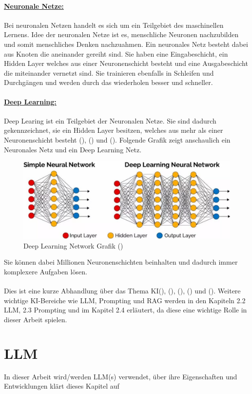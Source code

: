 \documentclass[12pt,toc=bib,toc=listof]{scrreprt}
\begin{document}
\\
\textbf{\underline{Neuronale Netze:}}\\
\\
Bei neuronalen Netzen handelt es sich um ein Teilgebiet des maschinellen Lernens. Idee der neuronalen Netze ist es, menschliche Neuronen nachzubilden und somit menschliches Denken nachzuahmen. Ein neuronales Netz besteht dabei aus Knoten die aneinander gereiht sind. Sie haben eine Eingabeschicht, ein Hidden Layer welches aus einer Neuronenschicht besteht und eine Ausgabeschicht die miteinander vernetzt sind. Sie trainieren ebenfalls in Schleifen und Durchgängen und werden durch das wiederholen besser und schneller.\\
\\
\textbf{\underline{Deep Learning:}}\\
\\
Deep Learing ist ein Teilgebiet der Neuronalen Netze. Sie sind dadurch gekennzeichnet, sie ein Hidden Layer besitzen, welches aus mehr als einer Neuronenschicht besteht (\cite{Bhatt2021}), (\cite{Dymatrix2018}) und (\cite{Zhu2021}). Folgende Grafik zeigt anschaulich ein Neuronales Netz und ein Deep Learning Netz.
\begin{figure} [H]
    \centering
    \includegraphics[width=0.75\linewidth]{./Bilder/Dymatrix_Deep_Learning_Networks.jpg}
    \caption{Deep Learning Network Grafik (\cite{Dymatrix2018})}
    \label{fig:enter-label}
\end{figure}
\noindent Sie können dabei Millionen Neuronenschichten beinhalten und dadurch immer komplexere Aufgaben lösen.\\
\\
Dies ist eine kurze Abhandlung über das Thema KI(\cite{Bhatt2021}), (\cite{Hecker2018}), (\cite{Mocko2021}), (\cite{Roscher2025}) und (\cite{Zhu2021}). Weitere wichtige KI-Bereiche wie LLM, Prompting und RAG werden in den Kapiteln 2.2 LLM, 2.3 Prompting und im Kapitel 2.4 erläutert, da diese eine wichtige Rolle in dieser Arbeit spielen.

\section{LLM} %
\label{sec:llm}
In dieser Arbeit wird/werden LLM(s) verwendet, über ihre Eigenschaften und Entwicklungen klärt dieses Kapitel auf
\end{document}
